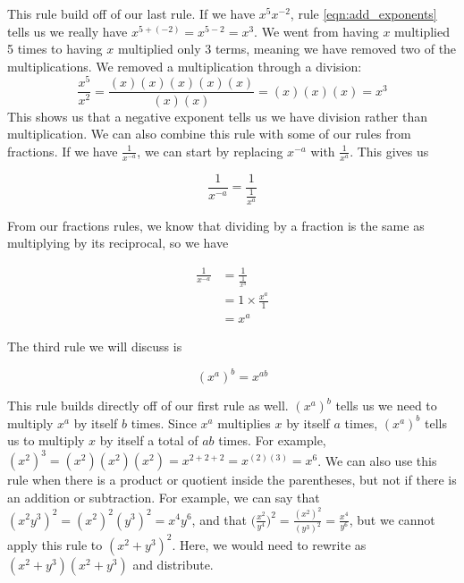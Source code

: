 \noindent
This rule build off of our last rule. If we have $x^5x^{-2}$, rule \ref{eqn:add_exponents} tells us we really have $x^{5+(-2)} = x^{5-2} = x^3$. We went from having $x$ multiplied 5 times to having $x$ multiplied only 3 terms, meaning we have removed two of the multiplications. We removed a multiplication through a division: 
\begin{equation*}
	\frac{x^5}{x^2} = \frac{(x)(x)(x)(x)(x)}{(x)(x)} = (x)(x)(x) = x^3
\end{equation*}
\noindent
This shows us that a negative exponent tells us we have division rather than multiplication. We can also combine this rule with some of our rules from fractions. If we have $\frac{1}{x^{-a}}$, we can start by replacing $x^{-a}$ with $\frac{1}{x^a}$. This gives us

\begin{equation*}
	\frac{1}{x^{-a}} = \frac{1}{\frac{1}{x^a}}
\end{equation*}

\noindent
From our fractions rules, we know that dividing by a fraction is the same as multiplying by its reciprocal, so we have

\begin{equation*}
	\begin{split}
		\frac{1}{x^{-a}} &= \frac{1}{\frac{1}{x^a}} \\
				 & = 1 \times \frac{x^a}{1} \\
				 & = x^a
	\end{split}
\end{equation*}


The third rule we will discuss is

\begin{equation}\label{eqn:mult_exponents}
	(x^a)^b = x^{ab}
\end{equation}

\noindent
This rule builds directly off of our first rule as well. $(x^a)^b$ tells us we need to multiply $x^a$ by itself $b$ times. Since $x^a$ multiplies $x$ by itself $a$ times, $(x^a)^b$ tells us to multiply $x$ by itself a total of $ab$ times. For example, $(x^2)^3 = (x^2)(x^2)(x^2) = x^{2+2+2} = x^{(2)(3)} = x^6$. We can also use this rule when there is a product or quotient inside the parentheses, but not if there is an addition or subtraction. For example, we can say that $(x^2y^3)^2 = (x^2)^2(y^3)^2 = x^4 y^6$, and that $\displaystyle \Bigg (\frac{x^2}{y^4}\Bigg) ^2 = \frac{(x^2)^2}{(y^3)^2} = \frac{x^4}{y^6}$, but we cannot apply this rule to $(x^2+y^3)^2$. Here, we would need to rewrite as $(x^2+y^3)(x^2+y^3)$ and distribute.

